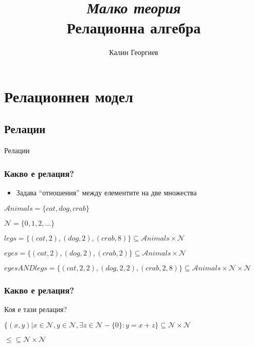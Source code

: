 \documentclass{beamer}
\begin{document}
\title[Увод в програмирането]{\textit{Малко теория}\\ Релационна алгебра} 
\author{Калин Георгиев} 
\frame{\titlepage} 

\section{Релационнен модел} 
\subsection{Релации}


\begin{frame}
\centerline{Релации}
\end{frame}

\begin{frame}[fragile]
\frametitle{Какво е релация?}

\begin{itemize}
  \item Задава ``отношения'' между елементите на две множества 
\end{itemize}

\vspace{1em}

$\mathcal{A}nimals=\{cat,dog,crab\}$

$\mathcal{N}=\{0,1,2,...\}$

\vspace{1em}

$legs=\{(cat,2),(dog,2),(crab,8)\} \subseteq \mathcal{A}nimals \times \mathcal{N}$

\vspace{1em}

$eyes=\{(cat,2),(dog,2),(crab,2)\} \subseteq \mathcal{A}nimals \times \mathcal{N}$


\vspace{1em}

$eyesANDlegs=\{(cat,2,2),(dog,2,2),(crab,2,8)\} \subseteq \mathcal{A}nimals \times \mathcal{N} \times \mathcal{N}$

\vspace{1em}

\end{frame}


\begin{frame}[fragile]
\frametitle{Какво е релация?}
Коя е тази релация?

$\{(x,y)|x \in \mathcal{N}, y \in \mathcal{N}, \exists z \in \mathcal{N}-\{0\}:y=x+z\} \subseteq \mathcal{N} \times \mathcal {N}$


\pause

\begin{center}
  $\leq \subseteq \mathcal{N} \times \mathcal{N}$
\end{center}

\end{frame}
\end{document}
